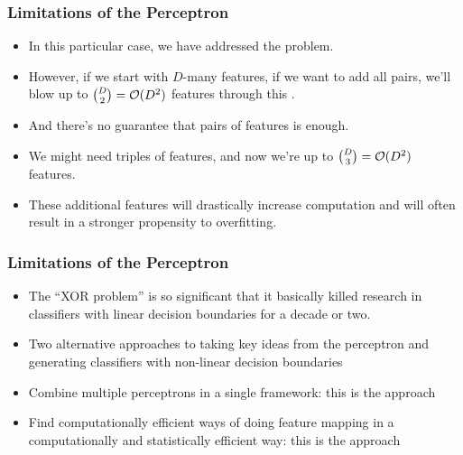 \documentclass[trans]{beamer}
\begin{document}
\begin{frame}
  \frametitle{Limitations of the Perceptron}
\begin{itemize}
\item 
In this particular case, we have addressed the problem.  
\item However, if
we start with $D$-many features, if we want to add all pairs, we'll
blow up to ${D \choose 2} = \mathcal{O}(D^2)$ features through this
. 
\item  And there's no guarantee that pairs of
features is enough. 
\item We might need triples of features, and now we're
up to ${D \choose 3} = \mathcal{O}(D^2)$ features.  
\item These additional features
will drastically increase computation and will often result in a
stronger propensity to overfitting.
\end{itemize}
\end{frame}

\begin{frame}
  \frametitle{Limitations of the Perceptron}
\begin{itemize}
\item 
The ``XOR problem'' is so significant that it basically
killed research in classifiers with linear decision boundaries for a
decade or two.
\item Two alternative
approaches to taking key ideas from the perceptron and generating
classifiers with non-linear decision boundaries
\item Combine multiple perceptrons in a single framework: this is the
 approach 
\item Find computationally efficient ways of doing
feature mapping in a computationally and statistically efficient way:
this is the  approach
\end{itemize}
\end{frame}


\end{document}
